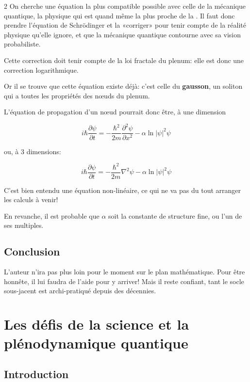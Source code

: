 \begin{multicols}{2}
On cherche une équation la plus compatible possible avec celle de la
mécanique quantique, la physique qui est quand même la plus proche de
la \PQ. Il faut donc prendre l'équation de Schrödinger et la
«corriger» pour tenir compte de la réalité physique qu'elle ignore,
et que la mécanique quantique contourne avec sa vision probabiliste.

Cette correction doit tenir compte de la loi fractale du plenum: elle est donc
une correction logarithmique.

Or il se trouve que cette équation existe déjà: c'est celle du
\textbf{gausson}, un soliton qui a toutes les propriétés des nœuds du plenum.\cite{bialynicki1976gaussons,}

L'équation de propagation d'un nœud pourrait donc être, à une dimension

\begin{equation*}
 i \hbar {\frac {\partial \psi} {\partial t}}=-\frac {\hbar^2}{2m} \frac {\partial ^{2}\psi }{\partial x^{2}}-\alpha\ln |\psi |^{2}\psi
\end{equation*}

ou, à 3 dimensions:

\begin{equation*}
	i \hbar {\frac {\partial \psi} {\partial t}}=-\frac {\hbar^2}{2m} \nabla^2 \psi  -\alpha\ln |\psi |^{2}\psi
\end{equation*}

C'est bien entendu une équation non-linéaire, ce qui ne va pas du tout
arranger les calculs à venir!

En revanche, il est probable que $\alpha$ soit la constante de structure fine, ou l'un de ses multiples.

\subsection{Conclusion}

L'auteur n'ira pas plus loin pour le moment sur le plan mathématique.
Pour être honnête, il lui faudra de l'aide pour y arriver! Mais il
reste confiant, tant le socle sous-jacent est archi-pratiqué depuis des
décennies.

\section{Les défis de la science et la plénodynamique quantique}

\subsection{Introduction}


\end{multicols}
